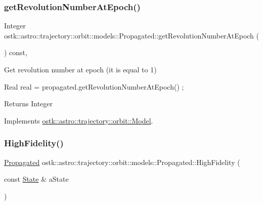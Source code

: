 \subsubsection{\texorpdfstring{get\+Revolution\+Number\+At\+Epoch()}{getRevolutionNumberAtEpoch()}}
{\footnotesize\ttfamily Integer ostk\+::astro\+::trajectory\+::orbit\+::models\+::\+Propagated\+::get\+Revolution\+Number\+At\+Epoch (\begin{DoxyParamCaption}{ }\end{DoxyParamCaption}) const\hspace{0.3cm}{\ttfamily [override]}, {\ttfamily [virtual]}}



Get revolution number at epoch (it is equal to 1) 


\begin{DoxyCode}
Real real = propagated.getRevolutionNumberAtEpoch() ;
\end{DoxyCode}


\begin{DoxyReturn}{Returns}
Integer 
\end{DoxyReturn}


Implements \hyperlink{classostk_1_1astro_1_1trajectory_1_1orbit_1_1_model_af3f1866f86045da2c05efe4165735cf4}{ostk\+::astro\+::trajectory\+::orbit\+::\+Model}.

\mbox{\label{classostk_1_1astro_1_1trajectory_1_1orbit_1_1models_1_1_propagated_a0cf68405428a87dabd0dd3327110cbc1}} 
\subsubsection{\texorpdfstring{High\+Fidelity()}{HighFidelity()}}
{\footnotesize\ttfamily \hyperlink{classostk_1_1astro_1_1trajectory_1_1orbit_1_1models_1_1_propagated}{Propagated} ostk\+::astro\+::trajectory\+::orbit\+::models\+::\+Propagated\+::\+High\+Fidelity (\begin{DoxyParamCaption}\item[{const \hyperlink{classostk_1_1astro_1_1trajectory_1_1_state}{State} \&}]{a\+State }\end{DoxyParamCaption})\hspace{0.3cm}{\ttfamily [static]}}



